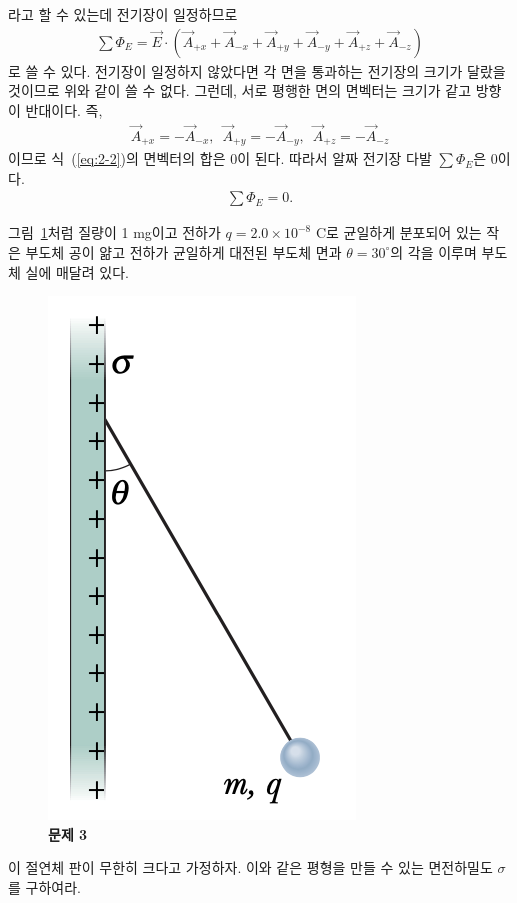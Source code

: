 \documentclass[tightenlines,floatfix,nofootinbib,superscriptaddress,fleqn]{revtex4-2}
\begin{document}
\begin{itemize}
  라고 할 수 있는데 전기장이 일정하므로 
  \begin{align}\label{eq:2-2}
    \sum\Phi_E=\vec{E}\cdot\left(\vec{A}_{+x}+\vec{A}_{-x}
    +\vec{A}_{+y}+\vec{A}_{-y}+\vec{A}_{+z}+\vec{A}_{-z}\right)
  \end{align}
  로 쓸 수 있다. 전기장이 일정하지 않았다면 각 면을 통과하는 전기장의 크기가 달랐을 것이므로
  위와 같이 쓸 수 없다. 그런데, 서로 평행한 면의 면벡터는 크기가 같고 방향이 반대이다. 즉,
  \begin{align}
    \vec{A}_{+x}=-\vec{A}_{-x},\,\,\,
    \vec{A}_{+y}=-\vec{A}_{-y},\,\,\,
    \vec{A}_{+z}=-\vec{A}_{-z}
  \end{align}
  이므로 식~(\ref{eq:2-2})의 면벡터의 합은 $0$이 된다. 따라서 
  알짜 전기장 다발 $\sum\Phi_E$은 $0$이다.
  \begin{align}
    \sum\Phi_E = 0.
  \end{align}
\end{itemize}
\vspace{0.5cm}
 그림~\ref{fig:2}처럼 질량이 1 mg이고
전하가 $q=2.0\times 10^{-8}$ C로 균일하게 분포되어 있는 작은 부도체
공이 얆고 전하가 균일하게 대전된 부도체 면과 $\theta=30^\circ$의
각을 이루며 부도체 실에 매달려 있다.  
\begin{figure}[htp]
  \centering
  \includegraphics[scale=0.6]{qfig3-2.png}
  \caption{\textbf{문제 3}}
  \label{fig:2}
\end{figure}
이 절연체 판이 무한히 크다고 가정하자. 이와 같은 평형을 만들 수 있는
면전하밀도 $\sigma$를 구하여라.
\vspace{0.5cm}
\end{document}
